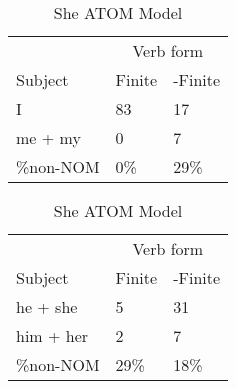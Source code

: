 \begin{table}[]
\caption{She ATOM Model}
\begin{minipage}{0.5\textwidth}
    \centering
    \begin{tabular}{@{}lll@{}}
        \toprule
         & \multicolumn{2}{c}{Verb form}\\
         \cline{2-3}
        Subject & Finite & -Finite \\
        \midrule
        I & 83 & 17 \\
        me + my & 0 & 7 \\
        \hline
        \%non-NOM & 0\% & 29\% \\
        \bottomrule
    \end{tabular}
\end{minipage}
\begin{minipage}{0.5\textwidth}
    \centering
    \begin{tabular}{@{}lll@{}}
        \toprule
         & \multicolumn{2}{c}{Verb form}\\
         \cline{2-3}
        Subject & Finite & -Finite \\
        \midrule
        he + she & 5 & 31 \\
        him + her & 2 & 7 \\
        \hline
        \%non-NOM & 29\% & 18\% \\
        \bottomrule
    \end{tabular}
    \end{minipage}


\end{table}
